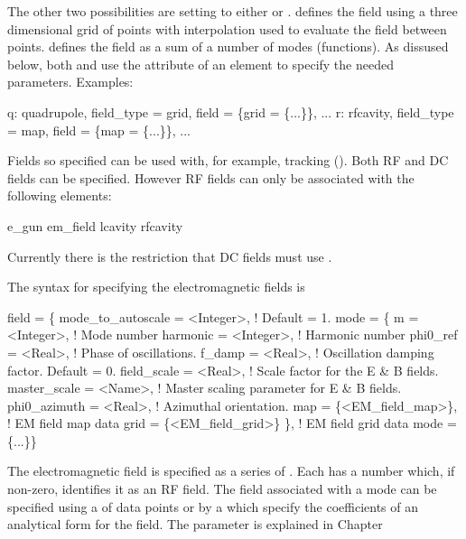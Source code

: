 The other two possibilities are setting  to either
 or .  defines the field using a three
dimensional grid of points with interpolation used to evaluate the
field between points.  defines the field as a sum of a number of
modes (functions). As dissused below, both  and  use the 
 attribute of an element to specify the needed parameters.
Examples:
\begin{example}
  q: quadrupole, field_type = grid, field = \{grid = \{...\}\}, ...
  r: rfcavity, field_type = map, field = \{map = \{...\}\}, ...
\end{example}
Fields so specified can be used with, for example, 
tracking (). Both RF and DC fields can be specified.
However RF fields can only be associated with the following elements:
\begin{example}
  e_gun
  em_field
  lcavity
  rfcavity
\end{example}
Currently there is the restriction that DC fields must use .

The syntax for specifying the electromagnetic fields is
\label{v:field}
\begin{example}
  field = \{
    mode_to_autoscale = <Integer>, ! Default = 1.
    mode = \{
      m             = <Integer>,   ! Mode number
      harmonic      = <Integer>,   ! Harmonic number 
      phi0_ref      = <Real>,      ! Phase of oscillations.
      f_damp        = <Real>,      ! Oscillation damping factor. Default = 0.
      field_scale   = <Real>,      ! Scale factor for the E & B fields.
      master_scale  = <Name>,      ! Master scaling parameter for E & B fields.
      phi0_azimuth  = <Real>,      ! Azimuthal orientation.
      map           = \{<EM_field_map>\},     ! EM field map data
      grid          = \{<EM_field_grid>\} \}, ! EM field grid data
    mode = \{...\}\}
\end{example}
The electromagnetic field is specified as a series of . Each
 has a  number which, if non-zero, identifies it
as an RF field. The field associated with a mode can be specified
using a  of data points or by a  which specify the
coefficients of an analytical form for the field.
The  parameter is explained in Chapter~

